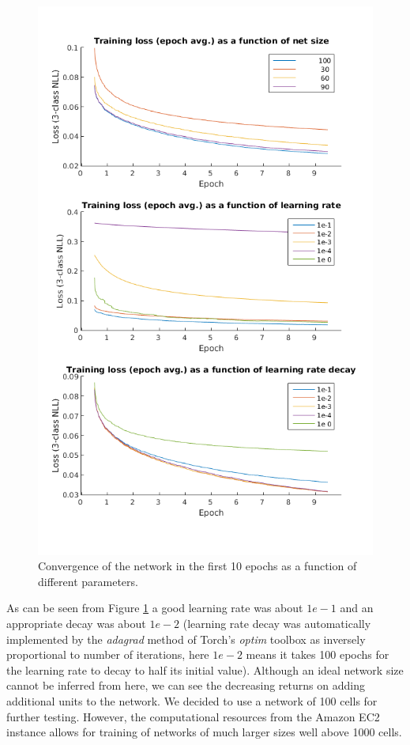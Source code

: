\documentclass{acm_proc_article-sp}
\begin{document}
\begin{figure}[H]
 \centering
 \includegraphics[scale=.5]{./figures/parameterSearch.png}
 \caption{Convergence of the network in the first 10 epochs as a function of different parameters.}
 \label{fig:paramSearch}
\end{figure}

As can be seen from Figure \ref{fig:paramSearch} a good learning rate was about $1e-1$ and an appropriate decay was about $1e-2$ (learning rate decay was automatically implemented by the \textit{adagrad} method of Torch's \textit{optim} toolbox as inversely proportional to number of iterations, here $1e-2$ means it takes 100 epochs for the learning rate to decay to half its initial value). Although an ideal network size cannot be inferred from here, we can see the decreasing returns on adding additional units to the network. We decided to use a network of 100 cells for further testing. However, the computational resources from the Amazon EC2 instance allows for training of networks of much larger sizes well above 1000 cells.
\end{document}
